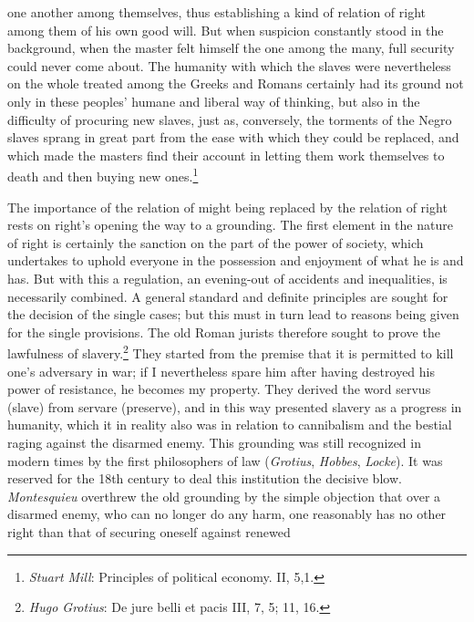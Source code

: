 \documentclass[12pt,a4paper,openany]{book}
\newcommand{\opage}[1]{\marginnote{\footnotesize\textit{[#1]}}}
\begin{document}
one another among themselves, thus establishing a kind of relation of
right among them of his own good will. But when suspicion constantly stood
in the background, when the master felt himself the one among the many,
full security could never come about. The humanity with which the slaves
were nevertheless on the whole treated among the Greeks and Romans
certainly had its ground not only in these peoples' humane and liberal
way of thinking, but also in the difficulty of procuring new slaves, just
as, conversely, the torments of the Negro slaves sprang in great part from
the ease with which they could be replaced, and which made the masters find
their account in letting them work themselves to death and then buying new
ones.\footnote[3]{\emph{Stuart Mill}: Principles of political economy. II,
5,1.}

\opage{97}The importance of the relation of might being replaced by the
relation of right rests on right's opening the way to a grounding. The
first element in the nature of right is certainly the sanction on the part
of the power of society, which undertakes to uphold everyone in the
possession and enjoyment of what he is and has. But with this a regulation,
an evening-out of accidents and inequalities, is necessarily combined. A
general standard and definite principles are sought for the decision of
the single cases; but this must in turn lead to reasons being given for
the single provisions. The old Roman jurists therefore sought to prove the
lawfulness of slavery.\footnote[1]{\emph{Hugo Grotius}: De jure belli et
pacis III, 7, 5; 11, 16.} They started from the premise that it is
permitted to kill one's adversary in war; if I nevertheless spare him after
having destroyed his power of resistance, he becomes my property. They
derived the word servus (slave) from servare (preserve), and in this way
presented slavery as a progress in humanity, which it in reality also was
in relation to cannibalism and the bestial raging against the disarmed
enemy. This grounding was still recognized in modern times by the first
philosophers of law (\emph{Grotius}, \emph{Hobbes}, \emph{Locke}). It was
reserved for the 18th century to deal this institution the decisive blow.
\emph{Montesquieu} overthrew the old grounding by the simple objection
that over a disarmed enemy, who can no longer do any harm, one reasonably
has no \opage{98}other right than that of securing oneself against renewed
\end{document}
